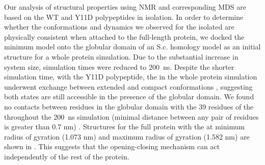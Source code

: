 Our analysis of \gct structural properties using NMR and corresponding MDS are based on the WT and Y11D \gct polypeptides in isolation. In order to determine whether the conformations and dynamics we observed for the isolated \gct are physically consistent when attached to the full-length \tub protein, we docked the minimum \diffusion \gct model  onto the globular domain of an S.c. \tub homology model as an initial structure for a whole protein simulation. Due to the substantial increase in system size, simulation times were reduced to \SI{200}{\ns}.  Despite the shorter simulation time, with the Y11D \gct polypeptide, the \gct in the whole protein simulation underwent exchange between extended and compact conformations , suggesting both states are still accessible in the presence of the globular domain. We found no contacts between residues in the globular domain with the 39 residues of the \gct throughout the \SI{200}{\ns} simulation (minimal distance between any pair of residues is greater than 0.7 nm) . Structures for the full protein with the \gct at minimum radius of gyration (1.073 nm) and maximum radius of gyration (1.582 nm) are shown in . This suggests that the \gct opening-closing mechanism can act independently of the rest of the protein.



\begin{figure}
	\thispagestyle{empty}
	\centering     %
	\clearpage
	\label{fig:globular}
\end{figure}


